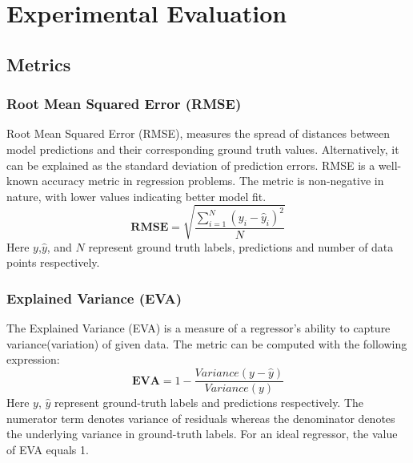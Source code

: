 

 \chapter{Experimental Evaluation}\label{chap_exp_eval}  
\section{Metrics}
\subsection{Root Mean Squared Error (RMSE)}
Root Mean Squared Error (RMSE), measures the spread of distances between model predictions and their corresponding ground truth values. Alternatively, it can be explained as the standard deviation of prediction errors. RMSE is a well-known accuracy metric in regression problems. The metric is non-negative in nature, with lower values indicating better model fit.
\begin{equation}
	\mathbf{RMSE} = \sqrt{\frac{\sum_{i=1}^{N}(y_i-\hat{y}_i)^2}{N}}
\end{equation}
Here $y$,$\hat{y}$, and $N$ represent ground truth labels, predictions and number of data points respectively.
\subsection{Explained Variance (EVA)}
The Explained Variance (EVA) is a measure of a regressor's ability to capture variance(variation) of given data. The metric can be computed with the following expression:
\begin{equation}
	\mathbf{EVA} = 1-\frac{Variance(y-\hat{y})}{Variance(y)}
\end{equation}
Here $y$, $\hat{y}$ represent ground-truth labels and predictions respectively. The numerator term denotes variance of residuals whereas the denominator denotes the underlying variance in ground-truth labels. For an ideal regressor, the value of EVA equals 1.
